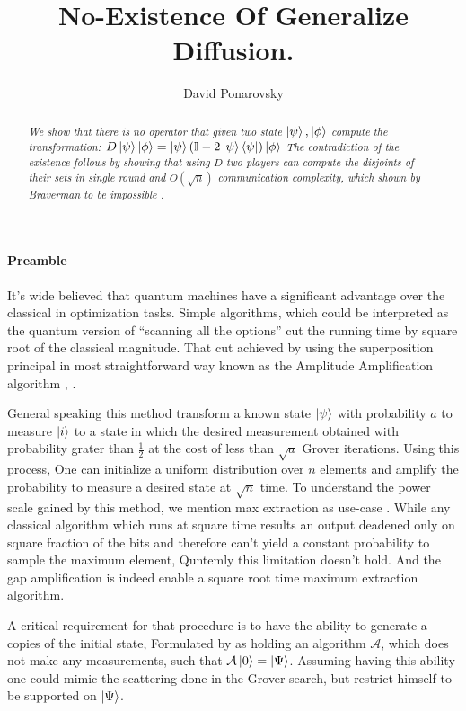 \documentclass{article}
\begin{document}
\title{No-Existence Of Generalize Diffusion.}
\author{David Ponarovsky}
\maketitle

\begin{abstract}\textit{We show that there is no operator that given two state $\ket{\psi},\ket{\phi}$ compute the transformation: $D \ket{\psi}\ket{\phi} = \ket{\psi}\left( \mathbb{I} - 2 \ket{\psi}\bra{\psi} \right)\ket{\phi} $ The contradiction of the existence follows by showing that using $D$ two players can compute the disjoints of their sets in single round and $O\left( \sqrt{n} \right)$ communication complexity, which shown by Braverman to be impossible \cite{Braverman}. }
\end{abstract}

\paragraph{Preamble} It's wide believed that quantum machines have a significant advantage over the classical in optimization tasks. Simple algorithms, which could be interpreted as the quantum version of ``scanning all the options'' cut the running time by square root of the classical magnitude. That cut achieved by using the superposition principal in most straightforward way known as the Amplitude Amplification algorithm \cite{Brassard_2002}, \cite{grover1996fast}. 

General speaking this method transform a known state $\ket{\psi}$  with probability $a$ to measure $\ket{i}$ to a state in which the desired measurement obtained with probability grater than $\frac{1}{2}$ at the cost of less than $\sqrt{a}$ Grover iterations. Using this process, One can initialize a uniform distribution over $n$ elements and amplify the probability to measure a desired state at $\sqrt{n}$ time. To understand the power scale gained by this method, we mention max extraction as use-case \cite{ahuja1999quantum}. While any classical algorithm which runs at square time results an output deadened only on square fraction of the bits and therefore can't yield a constant probability to sample the maximum element, Quntemly this limitation doesn't hold. And the gap amplification is indeed enable a square root time maximum extraction algorithm. 
  
  A critical requirement for that procedure is to have the ability to generate a copies of the initial state, Formulated by \cite{Brassard_2002} as holding an algorithm $\mathcal{A}$, which does not make any measurements, such that $\mathcal{A}\ket{0}=\ket{\Psi}$. Assuming having this ability one could mimic the scattering done in the Grover search, but restrict himself to be supported on $\ket{\Psi}$. 
\end{document}
